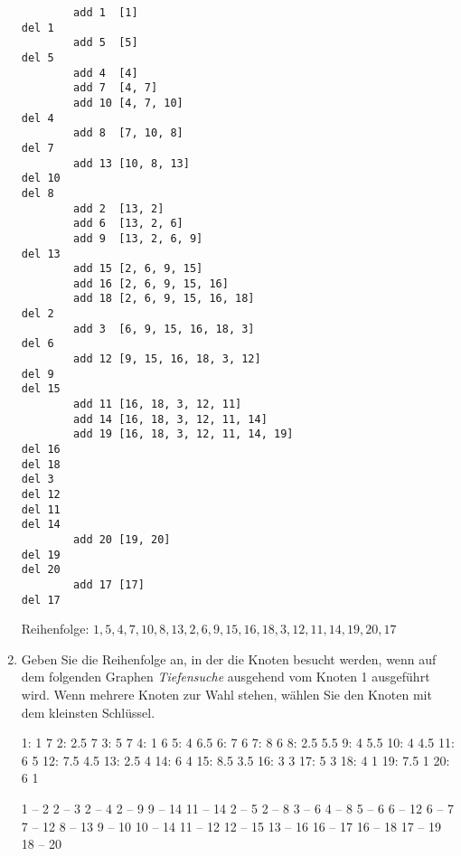 \documentclass{bschlangaul-aufgabe}
\begin{document}
\begin{enumerate}
\begin{center}
\begin{bAntwort}
{\footnotesize
\begin{verbatim}
        add 1  [1]
del 1
        add 5  [5]
del 5
        add 4  [4]
        add 7  [4, 7]
        add 10 [4, 7, 10]
del 4
        add 8  [7, 10, 8]
del 7
        add 13 [10, 8, 13]
del 10
del 8
        add 2  [13, 2]
        add 6  [13, 2, 6]
        add 9  [13, 2, 6, 9]
del 13
        add 15 [2, 6, 9, 15]
        add 16 [2, 6, 9, 15, 16]
        add 18 [2, 6, 9, 15, 16, 18]
del 2
        add 3  [6, 9, 15, 16, 18, 3]
del 6
        add 12 [9, 15, 16, 18, 3, 12]
del 9
del 15
        add 11 [16, 18, 3, 12, 11]
        add 14 [16, 18, 3, 12, 11, 14]
        add 19 [16, 18, 3, 12, 11, 14, 19]
del 16
del 18
del 3
del 12
del 11
del 14
        add 20 [19, 20]
del 19
del 20
        add 17 [17]
del 17
\end{verbatim}
}
Reihenfolge: $1, 5, 4, 7, 10, 8, 13, 2, 6, 9, 15, 16, 18, 3, 12, 11, 14, 19, 20, 17$
\end{bAntwort}

\end{center}

\item Geben Sie die Reihenfolge an, in der die Knoten besucht werden,
wenn auf dem folgenden Graphen \emph{Tiefensuche} ausgehend vom Knoten 1
ausgeführt wird. Wenn mehrere Knoten zur Wahl stehen, wählen Sie den
Knoten mit dem kleinsten Schlüssel.

\begin{bGraphenFormat}
1: 1 7
2: 2.5 7
3: 5 7
4: 1 6
5: 4 6.5
6: 7 6
7: 8 6
8: 2.5 5.5
9: 4 5.5
10: 4 4.5
11: 6 5
12: 7.5 4.5
13: 2.5 4
14: 6 4
15: 8.5 3.5
16: 3 3
17: 5 3
18: 4 1
19: 7.5 1
20: 6 1

 1 -- 2
 2 -- 3
 2 -- 4
 2 -- 9
 9 -- 14
11 -- 14
 2 -- 5
 2 -- 8
 3 -- 6
 4 -- 8
 5 -- 6
 6 -- 12
 6 -- 7
 7 -- 12
 8 -- 13
 9 -- 10
10 -- 14
11 -- 12
12 -- 15
13 -- 16
16 -- 17
16 -- 18
17 -- 19
18 -- 20
\end{bGraphenFormat}

\begin{center}
\end{center}
\end{enumerate}
\end{document}
